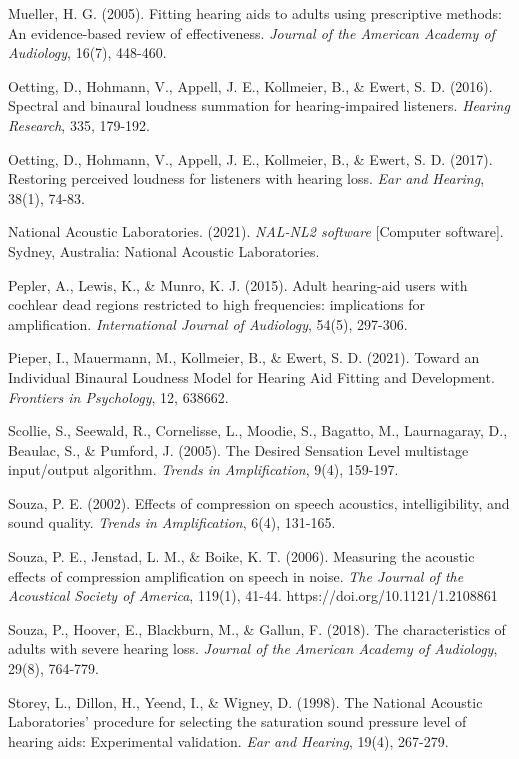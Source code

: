\documentclass[
  12pt,
]{article}
\begin{document}
Mueller, H. G. (2005). Fitting hearing aids to adults using prescriptive
methods: An evidence-based review of effectiveness. \emph{Journal of the
American Academy of Audiology}, 16(7), 448-460.

Oetting, D., Hohmann, V., Appell, J. E., Kollmeier, B., \& Ewert, S. D.
(2016). Spectral and binaural loudness summation for hearing-impaired
listeners. \emph{Hearing Research}, 335, 179-192.

Oetting, D., Hohmann, V., Appell, J. E., Kollmeier, B., \& Ewert, S. D.
(2017). Restoring perceived loudness for listeners with hearing loss.
\emph{Ear and Hearing}, 38(1), 74-83.

National Acoustic Laboratories. (2021). \emph{NAL-NL2 software}
{[}Computer software{]}. Sydney, Australia: National Acoustic
Laboratories.

Pepler, A., Lewis, K., \& Munro, K. J. (2015). Adult hearing-aid users
with cochlear dead regions restricted to high frequencies: implications
for amplification. \emph{International Journal of Audiology}, 54(5),
297-306.

Pieper, I., Mauermann, M., Kollmeier, B., \& Ewert, S. D. (2021). Toward
an Individual Binaural Loudness Model for Hearing Aid Fitting and
Development. \emph{Frontiers in Psychology}, 12, 638662.

Scollie, S., Seewald, R., Cornelisse, L., Moodie, S., Bagatto, M.,
Laurnagaray, D., Beaulac, S., \& Pumford, J. (2005). The Desired
Sensation Level multistage input/output algorithm. \emph{Trends in
Amplification}, 9(4), 159-197.

Souza, P. E. (2002). Effects of compression on speech acoustics,
intelligibility, and sound quality. \emph{Trends in Amplification},
6(4), 131-165.

Souza, P. E., Jenstad, L. M., \& Boike, K. T. (2006). Measuring the
acoustic effects of compression amplification on speech in noise.
\emph{The Journal of the Acoustical Society of America}, 119(1), 41-44.
https://doi.org/10.1121/1.2108861

Souza, P., Hoover, E., Blackburn, M., \& Gallun, F. (2018). The
characteristics of adults with severe hearing loss. \emph{Journal of the
American Academy of Audiology}, 29(8), 764-779.

Storey, L., Dillon, H., Yeend, I., \& Wigney, D. (1998). The National
Acoustic Laboratories' procedure for selecting the saturation sound
pressure level of hearing aids: Experimental validation. \emph{Ear and
Hearing}, 19(4), 267-279.
\end{document}
